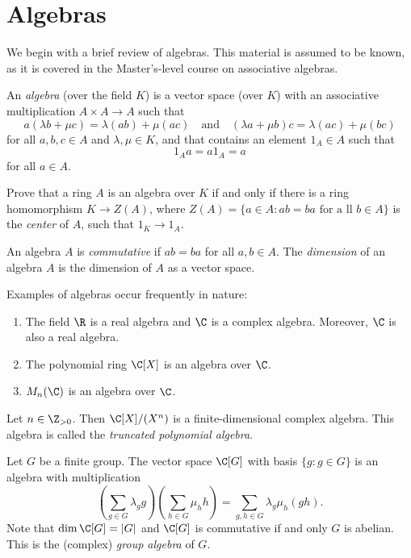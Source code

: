 \section{Algebras}

We begin with a brief review of algebras.
This material is assumed to be known, as it is covered in the Master's-level course on associative algebras.

An \emph{algebra} (over the field $K$) is a vector space (over $K$)
with an associative multiplication $A\times A\to A$ such that
\[
a(\lambda b+\mu c)=\lambda(ab)+\mu(ac)\quad\text{and}\quad
(\lambda a+\mu b)c=\lambda(ac)+\mu (bc)
 \]
for all $a,b,c\in A$ and $\lambda,\mu\in K$, and
that contains an element $1_A\in A$ such that
 \[
 1_Aa=a1_A=a
 \]
 for all $a\in A$.

\begin{exercise}
\label{xca:center}
Prove that a ring $A$ is an algebra over $K$
if and only if
there is a ring homomorphism $K\to Z(A)$, where $Z(A)=\{a\in A:ab=ba\text{ for a
ll $b\in A$}\}$ is the \emph{center}
of $A$,
such that $1_K\to 1_A$.
\end{exercise}

An algebra $A$ is \emph{commutative} if $ab=ba$ for all $a,b\in A$.
The \emph{dimension} of an algebra $A$ is the dimension of $A$ as a vector space. 

Examples of algebras 
occur frequently in nature: 
\begin{enumerate}
    \item The field $\R$ is a real algebra and
        $\C$ is a complex algebra. Moreover, $\C$ is also a real algebra.
    \item The polynomial ring $\C[X]$ is an algebra over $\C$. 
    \item $M_n(\C)$ is an algebra over $\C$. 
\end{enumerate}

\begin{example}
        Let $n\in\Z_{>0}$. Then $\C[X]/(X^n)$ is a finite-dimensional complex algebra. 
        This algebra is called the \emph{truncated polynomial algebra}.
\end{example}

\begin{example}
        Let $G$ be a finite group. The vector space
        $\C[G]$ with basis $\{g:g\in G\}$
        is an algebra with multiplication
        \[
        \left(\sum_{g\in G}\lambda_gg\right)\left(\sum_{h\in G}\mu_hh\right)
        =\sum_{g,h\in G}\lambda_g\mu_h(gh).
        \]
        Note that $\dim\C[G]=|G|$ and
        $\C[G]$ is commutative if and only $G$ is abelian.
        This is the (complex) \emph{group algebra} of $G$.
\end{example}

